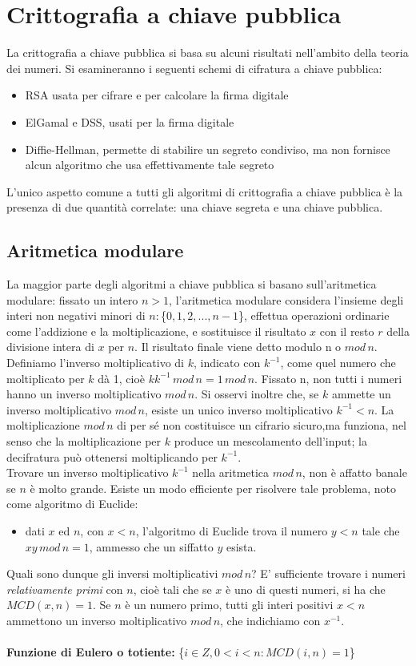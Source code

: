 \chapter{Crittografia a chiave pubblica} \label{ch:publickey}
La crittografia a chiave pubblica si basa su alcuni risultati nell'ambito della teoria dei numeri. Si esamineranno i seguenti schemi di cifratura a chiave pubblica: \begin{itemize}
\item RSA usata per cifrare e per calcolare la firma digitale
\item ElGamal e DSS, usati per la firma digitale
\item Diffie-Hellman, permette di stabilire un segreto condiviso, ma non fornisce alcun algoritmo che usa effettivamente tale segreto
\end{itemize}
L'unico aspetto comune a tutti gli algoritmi di crittografia a chiave pubblica è la presenza di due quantità correlate: una chiave segreta e una chiave pubblica.
\section{Aritmetica modulare}
La maggior parte degli algoritmi a chiave pubblica si basano sull'aritmetica modulare: fissato un intero $ n>1 $, l'aritmetica modulare considera l'insieme degli interi non negativi minori di
$n: $\{$0, 1, 2,..., n-1$\}, effettua operazioni ordinarie come l'addizione e la moltiplicazione, e sostituisce il risultato $x$ con il resto $r$ della divisione intera di $x$ per $n$. Il risultato finale viene detto modulo n o $mod \, n$. \\
Definiamo l'inverso moltiplicativo di $k$, indicato con $k^{-1}$, come quel numero che moltiplicato per $k$ dà 1, cioè $kk^{-1} \, mod \, n = 1 \, mod \, n$. Fissato n, non tutti i numeri hanno un inverso moltiplicativo $mod \, n$. Si osservi inoltre che, se $k$ ammette un inverso moltiplicativo $mod \, n $, esiste un unico inverso moltiplicativo $k^{-1} < n$. La moltiplicazione $mod \, n$ di per sé non costituisce un cifrario sicuro,ma funziona, nel senso che la moltiplicazione per $k$ produce un mescolamento dell'input; la decifratura può ottenersi moltiplicando per $k^{-1}$.\\ Trovare un inverso moltiplicativo $k^{-1}$ nella aritmetica $mod \, n$, non è affatto banale se $n$ è molto grande. Esiste un modo efficiente per risolvere tale problema, noto come algoritmo di Euclide: \begin{itemize}
\item dati $x$ ed $n$, con $x<n$, l'algoritmo di Euclide trova il
numero $y<n$ tale che $xy \, mod \, n = 1$, ammesso che un siffatto $y$ esista.\end{itemize} 
Quali sono dunque gli inversi moltiplicativi $mod \, n$? E' sufficiente trovare i numeri \textit{relativamente primi} con $n$, cioè tali che se $x$ è uno di questi numeri, si ha che $MCD(x,n) = 1$. Se $n$ è un numero primo, tutti gli interi positivi $x<n$ ammettono un inverso moltiplicativo $mod \, n$, che indichiamo con $x^{-1}$.\\ \\
\textbf{Funzione di Eulero o totiente:} \{$i \in Z, 0 < i < n: MCD(i,n) = 1$\} \\


